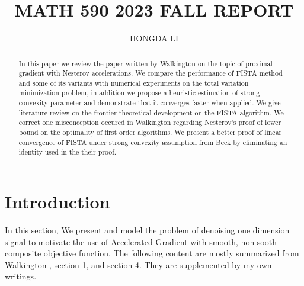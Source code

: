 \documentclass[]{article}
\title{MATH 590 2023 FALL REPORT}
\author{HONGDA LI}
\theoremstyle{definition}
\numberwithin{equation}{subsection}
\begin{document}
\maketitle

\begin{abstract}
    In this paper we review the paper written by Walkington \cite{noel_nesterovs_nodate} on the topic of proximal gradient with Nesterov accelerations. 
    We compare the performance of FISTA method and some of its variants with numerical experiments on the total variation minimization problem, in addition we propose a heuristic estimation of strong convexity parameter and demonstrate that it converges faster when applied. 
    We give literature review on the frontier theoretical development on the FISTA algorithm. 
    We correct  one misconception occured in Walkington \cite{noel_nesterovs_nodate} regarding Nesterov's proof of lower bound on the optimality of first order algorithms.  
    We present a better proof of linear convergence of FISTA under strong convexity assumption from Beck \cite[theorem 10.7.7]{beck_first-order_nodate} by eliminating an identity used in the their proof. 
\end{abstract}


\section{Introduction}
    In this section, We present and model the problem of denoising one dimension signal to motivate the use of Accelerated Gradient with smooth, non-sooth composite objective function. 
    The following content are mostly summarized from Walkington \cite{noel_nesterovs_nodate}, section 1, and section 4. They are supplemented by my own writings. 
\end{document}
